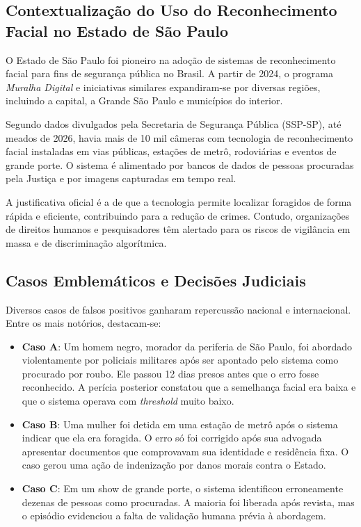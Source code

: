 \documentclass[12pt,a4paper]{article}
\begin{document}
\subsection{Contextualização do Uso do Reconhecimento Facial no Estado de São Paulo}

O Estado de São Paulo foi pioneiro na adoção de sistemas de reconhecimento facial para fins de segurança pública no Brasil. A partir de 2024, o programa \textit{Muralha Digital} e iniciativas similares expandiram-se por diversas regiões, incluindo a capital, a Grande São Paulo e municípios do interior.

Segundo dados divulgados pela Secretaria de Segurança Pública (SSP-SP), até meados de 2026, havia mais de 10 mil câmeras com tecnologia de reconhecimento facial instaladas em vias públicas, estações de metrô, rodoviárias e eventos de grande porte. O sistema é alimentado por bancos de dados de pessoas procuradas pela Justiça e por imagens capturadas em tempo real.

A justificativa oficial é a de que a tecnologia permite localizar foragidos de forma rápida e eficiente, contribuindo para a redução de crimes. Contudo, organizações de direitos humanos e pesquisadores têm alertado para os riscos de vigilância em massa e de discriminação algorítmica.

\subsection{Casos Emblemáticos e Decisões Judiciais}

Diversos casos de falsos positivos ganharam repercussão nacional e internacional. Entre os mais notórios, destacam-se:

\begin{itemize}
    \item \textbf{Caso A}: Um homem negro, morador da periferia de São Paulo, foi abordado violentamente por policiais militares após ser apontado pelo sistema como procurado por roubo. Ele passou 12 dias presos antes que o erro fosse reconhecido. A perícia posterior constatou que a semelhança facial era baixa e que o sistema operava com \textit{threshold} muito baixo.
    
    \item \textbf{Caso B}: Uma mulher foi detida em uma estação de metrô após o sistema indicar que ela era foragida. O erro só foi corrigido após sua advogada apresentar documentos que comprovavam sua identidade e residência fixa. O caso gerou uma ação de indenização por danos morais contra o Estado.
    
    \item \textbf{Caso C}: Em um show de grande porte, o sistema identificou erroneamente dezenas de pessoas como procuradas. A maioria foi liberada após revista, mas o episódio evidenciou a falta de validação humana prévia à abordagem.
\end{itemize}
\end{document}
